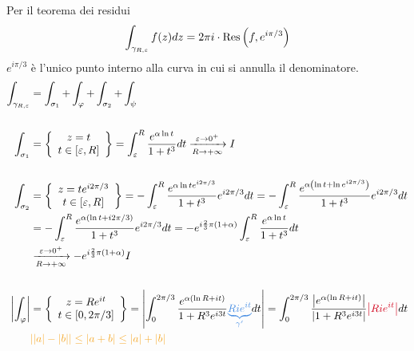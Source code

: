 Per il teorema dei residui
\begin{equation*}
\int_{\gamma_{R, \varepsilon}} f(z) dz = 2\pi i \cdot \operatorname{Res} \left(f, e^{i\pi /3}\right)
\end{equation*}
$e^{i\pi /3}$ è l'unico punto interno alla curva in cui si annulla il denominatore.
\begin{equation*}
\begin{aligned}
\int_{\gamma_{R, \varepsilon}} & = \int_{\sigma_{1}} + \int_{\varphi} + \int_{\sigma_{2}} + \int_{\psi}\\
 & \\
\int_{\sigma_{1}} & = \left\{
\begin{array}{c}
z = t\\
t\in [ \varepsilon, R]
\end{array}\right\} = \int^{R}_{\varepsilon}\frac{e^{\alpha \ln t}}{1 + t^{3}} dt\xrightarrow[R\rightarrow + \infty ]{\varepsilon \rightarrow 0^{+}} I\\
 & \\
\int_{\sigma_{2}} & = \left\{
\begin{array}{c}
z = te^{i2\pi /3}\\
t\in [ \varepsilon, R]
\end{array}\right\} = - \int^{R}_{\varepsilon}\frac{e^{\alpha \ln te^{i2\pi /3}}}{1 + t^{3}} e^{i2\pi /3} dt = -\int^{R}_{\varepsilon}\frac{e^{\alpha \left(\ln t + \ln e^{i2\pi /3}\right)}}{1 + t^{3}} e^{i2\pi /3} dt\\
 & = - \int^{R}_{\varepsilon}\frac{e^{\alpha (\ln t + i2\pi /3)}}{1 + t^{3}} e^{i2\pi /3} dt = -e^{i\frac{2}{3} \pi (1 + \alpha)}\int^{R}_{\varepsilon}\frac{e^{\alpha \ln t}}{1 + t^{3}} dt\\
 & \xrightarrow[R\rightarrow + \infty ]{\varepsilon \rightarrow 0^{+}} - e^{i\frac{2}{3} \pi (1 + \alpha)} I\\
 & \\
\left| \int_{\varphi}\right| & = \left\{
\begin{array}{c}
z = Re^{it}\\
t\in [ 0, 2\pi /3]
\end{array}\right\} = \left| \int^{2\pi /3}_{0}\frac{e^{\alpha (\ln R + it)}}{1 + R^{3} e^{i3t}}\textcolor[rgb]{0.29, 0.56, 0.89}{\underbrace{Rie^{it}}_{\gamma '}} dt\right| = \int^{2\pi /3}_{0}\frac{\left| e^{\alpha (\ln R + it)}\right|}{\left| 1 + R^{3} e^{i3t}\right|}\textcolor[rgb]{0.82, 0.01, 0.11}{\left| Rie^{it}\right|} dt\\
 & \textcolor[rgb]{0.96, 0.65, 0.14}{| | a| - | b| | \leq | a + b| \leq | a| + | b|}\\

\end{aligned}
\end{equation*}
